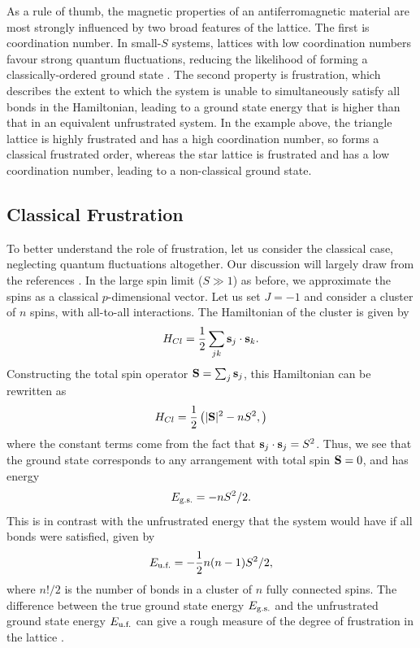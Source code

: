 As a rule of thumb, the magnetic properties of an antiferromagnetic material are most strongly influenced by two broad features of the lattice. The first is coordination number. In small-$S$ systems, lattices with low coordination numbers favour strong quantum fluctuations, reducing the likelihood of forming a classically-ordered ground state \cite{richter_quantum_2004}. The second property is frustration, which describes the extent to which the system is unable to simultaneously satisfy all bonds in the Hamiltonian, leading to a ground state energy that is higher than that in an equivalent unfrustrated system. In the example above, the triangle lattice is highly frustrated and has a high coordination number, so forms a classical frustrated order, whereas the star lattice is frustrated and has a low coordination number, leading to a non-classical ground state. 

\subsection{Classical Frustration}

To better understand the role of frustration, let us consider the classical case, neglecting quantum fluctuations altogether. Our discussion will largely draw from the references \cite{ramirez_strongly_1994,moessner_magnets_2001,chalker_geometrically_2011}. In the large spin limit ($S\gg1$) as before, we approximate the spins as a classical $p$-dimensional vector. Let us set $J = -1$ and consider a cluster of $n$ spins, with all-to-all interactions. The Hamiltonian of the cluster is given by
\begin{align}
    H_{Cl} = \frac 12 \sum_{jk} \textbf s_j \cdot \textbf s_k.
\end{align}
Constructing the total spin operator $\textbf S = \sum_{j}\textbf s_j$, this Hamiltonian can be rewritten as
\begin{align} \label{eqn:total_spin_trick}
    H_{Cl} = \frac 12 \left (
        |\textbf S|^2 - n S^2,
        \right )
\end{align}
where the constant terms come from the fact that $\textbf s_j \cdot \textbf s_j = S^2$. Thus, we see that the ground state corresponds to any arrangement with total spin $\textbf S = 0$, and has energy 
\begin{align}
    E_\textup{g.s.} = -nS^2/2.
\end{align}
This is in contrast with the unfrustrated energy that the system would have if all bonds were satisfied, given by 
\begin{align}E_{\textup{u.f.}} = - \frac 12 n(n-1)S^2/2,
\end{align}
where $n!/2$ is the number of bonds in a cluster of $n$ fully connected spins. The difference between the true ground state energy $E_\textup{g.s.}$ and the unfrustrated ground state energy $E_{\textup{u.f.}}$ can give a rough measure of the degree of frustration in the lattice \cite{kobe_frustration_1995}.

